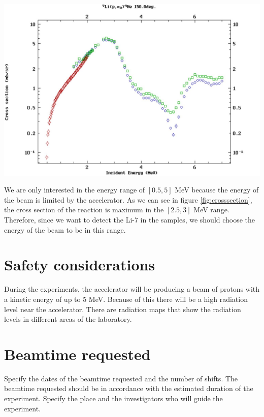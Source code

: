 \documentclass{article}
\begin{document}
\begin{multicols}{2}
\begin{center}
  \includegraphics[width=0.95\linewidth]{../images/Li_crosssection_energy.jpeg}
  \label{fig:crosssection}
\end{center}

We are only interested in the energy range of $[0.5,5]$ MeV because the energy of the beam is limited by the accelerator.
As we can see in figure \ref{fig:crosssection}, the cross section of the reaction is maximum in the $[2.5,3]$ MeV range. 
Therefore, since we want to detect the Li-7 in the samples, we should choose the energy of the beam to be in this range.

\section{Safety considerations}

During the experiments, the accelerator will be producing a beam of protons with a kinetic energy of up to 5 MeV. Because of this there will be a high radiation level near the accelerator.
There are radiation maps that show the radiation levels in different areas of the laboratory.

\section{Beamtime requested}

Specify the dates of the beamtime requested and the number of shifts. The beamtime requested should be in accordance with
the estimated duration of the experiment. Specify the place and the investigators who will guide the experiment.


\end{multicols}
\end{document}
